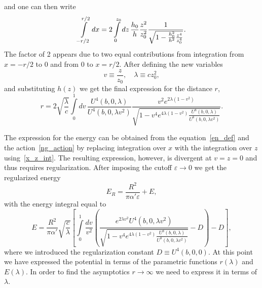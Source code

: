 \documentclass[a4paper,11pt]{article}
\newcommand{\lb}[0]{\left(}
\newcommand{\rb}[0]{\right)}
\newcommand{\lsb}{\left[}
\newcommand{\rsb}{\right]}
\newcommand{\veps}{\varepsilon}
\begin{document}
and one can then write
\begin{equation}
\label{x_z_int}
  \int\displaylimits_{-r/2}^{r/2}dx=2\int\displaylimits_{0}^{z_0}dz\,\frac{h_0}{h}\frac{z^2}{z_0^2}
  \frac{1}{\sqrt{1-\frac{h_0^2}{h^2}\frac{z^4}{z_0^4}}}.
\end{equation}
The factor of 2 appears due to two equal contributions from integration from $x=-r/2$ to $0$ and from $0$ to $x=r/2$.
After defining the new variables
\begin{equation}
  v\equiv\frac{z}{z_0},\quad
  \lambda\equiv cz_0^2,
\end{equation}
and substituting \(h(z)\) we get the final expression for the distance $r$,
\begin{equation}
  r=2\sqrt{\frac{\lambda}{c}}\int\limits_0^1dv\,
  \frac{U^4(b,0,\lambda)}{U^4(b,0,\lambda v^2)}
  \frac{v^2e^{2\lambda(1-v^2)}}
  {\sqrt{1-v^4e^{4\lambda(1-v^2)}\frac{U^8(b,0,\lambda)}{U^8(b,0,\lambda v^2)}}}.
\end{equation}

The expression for the energy can be obtained from the equation~\eqref{en_def} and the
action~\eqref{ng_action} by replacing integration over \(x\) with the integration over
\(z\) using~\eqref{x_z_int}. The resulting expression, however, is divergent at \(v=z=0\)
and thus requires regularization. After imposing the cutoff $\veps\rightarrow0$ we get the
regularized energy
\begin{equation}
  E_R=\frac{R^2}{\pi\alpha'\veps}+E,
\end{equation}
with the energy integral equal to
\begin{equation}
  E=\frac{R^2}{\pi\alpha'}\sqrt{\frac{c}{\lambda}}\lsb\int\limits_0^1\frac{dv}{v^2}\lb
  \frac{e^{2\lambda v^2}U^4(b,0,\lambda v^2)}{\sqrt{1-v^4e^{4\lambda(1-v^2)}\frac{U^8(b,0,\lambda)}{U^8(b,0,\lambda v^2)}}}-D\rb-D\rsb,
\end{equation}
where we introduced the regularization constant \(D\equiv U^4(b,0,0)\). At this point we have
expressed the potential in terms of the parametric functions \(r(\lambda)\) and
\(E(\lambda)\). In order to find the asymptotics \(r\to\infty\) we need to express it in terms of \(\lambda\).
\end{document}
